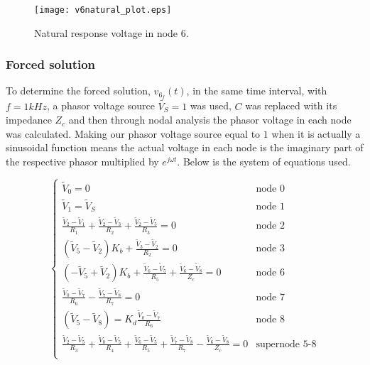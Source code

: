 

\begin{figure}[H] \centering
\texttt{[image: v6natural\_plot.eps]}
\caption{Natural response voltage in node 6.}
\label{fig:natural}
\end{figure}


\subsubsection{Forced solution}  %
\label{subsubsec:theor_forced}
To determine the forced solution, $v_{6_{f}}(t)$, in the same time interval, with $f=1kHz$, a phasor voltage source $\tilde{V_S}=1$ was used, $C$ was replaced with its impedance $Z_c$ and then through nodal analysis the phasor voltage in each node was calculated. Making our phasor voltage source equal to $1$ when it is actually a sinusoidal function means the actual voltage in each node is the imaginary part of the respective phasor multiplied by $e^{j \omega t}$. Below is the system of equations used.


\begin{equation}
  \begin{cases}
  \tilde{V}_0 = 0 & \mbox{node 0} \\
   \tilde{V}_1 = \tilde{V}_S & \mbox{node 1} \\
  \frac{\tilde{V}_2-\tilde{V}_1}{R_1}+\frac{\tilde{V}_2-\tilde{V}_3}{R_2}+\frac{\tilde{V}_2-\tilde{V}_5}{R_3} = 0 & \mbox{node 2} \\
  (\tilde{V}_5-\tilde{V}_2)K_b + \frac{\tilde{V}_3-\tilde{V}_2}{R_2} = 0 & \mbox{node 3} \\
  (-\tilde{V}_5+\tilde{V}_2)K_b + \frac{\tilde{V}_6-\tilde{V}_5}{R_5} + \frac{\tilde{V}_6-\tilde{V}_8}{Z_c} = 0 & \mbox{node 6} \\
  \frac{\tilde{V}_0-\tilde{V}_7}{R_6} - \frac{\tilde{V}_7-\tilde{V}_8}{R_7} = 0 & \mbox{node 7} \\
  (\tilde{V}_5-\tilde{V}_8) = K_d \frac{\tilde{V}_0-\tilde{V}_7}{R_6} & \mbox{node 8} \\
  \frac{\tilde{V}_2-\tilde{V}_5}{R_3} + \frac{\tilde{V}_0-\tilde{V}_5}{R_4} + \frac{\tilde{V}_6-\tilde{V}_5}{R_5} + \frac{\tilde{V}_7-\tilde{V}_8}{R_7} - \frac{\tilde{V}_6-\tilde{V}_8}{Z_c} = 0 & \mbox{supernode 5-8} \\ 
  \end{cases}
\end{equation}

